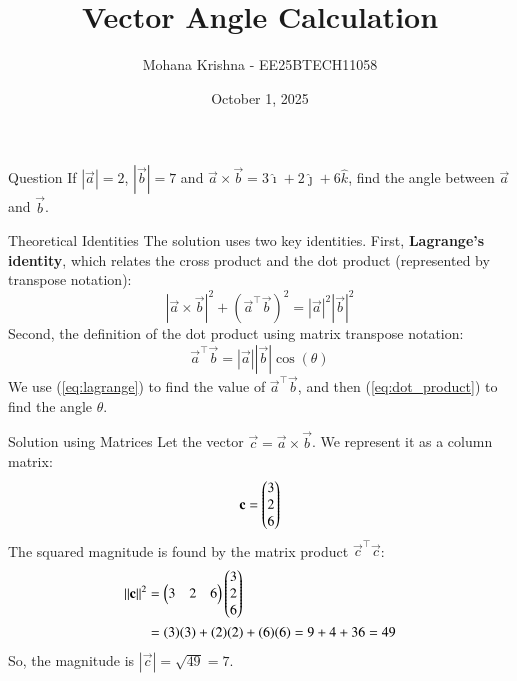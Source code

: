 \documentclass{beamer}
\begin{document}
\title
{Vector Angle Calculation}
\date{October 1, 2025}

\author
{Mohana Krishna - EE25BTECH11058}

\frame{\titlepage}

\begin{frame}{Question}
If $|\vec{a}| = 2$, $|\vec{b}| = 7$ and $\vec{a} \times \vec{b} = 3\hat{\imath} + 2\hat{\jmath} + 6\hat{k}$, find the angle between $\vec{a}$ and $\vec{b}$.
\end{frame}

\begin{frame}{Theoretical Identities}
The solution uses two key identities. First, \textbf{Lagrange's identity}, which relates the cross product and the dot product (represented by transpose notation):
\begin{equation}
|\vec{a} \times \vec{b}|^2 + (\vec{a}^\top\vec{b})^2 = |\vec{a}|^2 |\vec{b}|^2
\label{eq:lagrange}
\end{equation}
Second, the definition of the dot product using matrix transpose notation:
\begin{equation}
\vec{a}^\top\vec{b} = |\vec{a}| |\vec{b}| \cos(\theta)
\label{eq:dot_product}
\end{equation}
We use (\ref{eq:lagrange}) to find the value of $\vec{a}^\top\vec{b}$, and then (\ref{eq:dot_product}) to find the angle $\theta$.
\end{frame}

\begin{frame}{Solution using Matrices}
Let the vector $\vec{c} = \vec{a} \times \vec{b}$. We represent it as a column matrix:
\begin{equation}
\mathbf{c} = \begin{pmatrix}3 \\ 2 \\ 6\end{pmatrix}
\end{equation}
The squared magnitude is found by the matrix product $\vec{c}^\top\vec{c}$:
\begin{align*}
\left\lVert\mathbf{c}\right\rVert^2 &= \begin{pmatrix}3 & 2 & 6\end{pmatrix} \begin{pmatrix}3 \\ 2 \\ 6\end{pmatrix} \\
&= (3)(3) + (2)(2) + (6)(6) = 9 + 4 + 36 = 49
\end{align*}
So, the magnitude is $|\vec{c}| = \sqrt{49} = 7$.
\end{frame}
\end{document}
